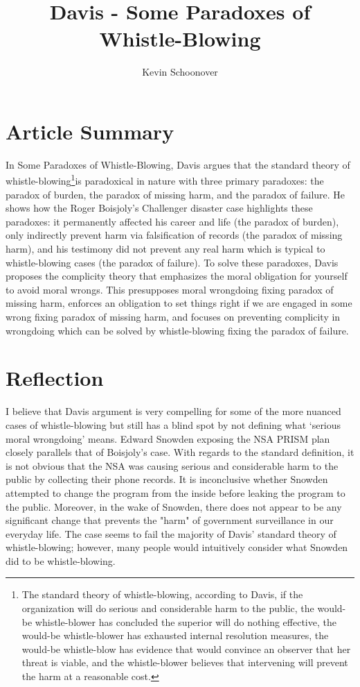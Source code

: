 \documentclass[12pt]{article}
\begin{document}
\title{Davis - Some Paradoxes of Whistle-Blowing}
\author{Kevin Schoonover}

\maketitle

\section{Article Summary}
In Some Paradoxes of Whistle-Blowing, Davis argues that the standard theory of
whistle-blowing\footnote{The standard theory of whistle-blowing, according to
Davis, if the organization will do serious and considerable harm to the public,
the would-be whistle-blower has concluded the superior will do nothing
effective, the would-be whistle-blower has exhausted internal resolution
measures, the would-be whistle-blow has evidence that would convince an observer
that her threat is viable, and the whistle-blower believes that intervening will
prevent the harm at a reasonable cost.}is paradoxical in nature with three
primary paradoxes: the paradox of burden, the paradox of missing harm, and the
paradox of failure.  He shows how the Roger Boisjoly's Challenger disaster case
highlights these paradoxes: it permanently affected his career and life (the
paradox of burden), only indirectly prevent harm via falsification of records
(the paradox of missing harm), and his testimony did not prevent any real harm
which is typical to whistle-blowing cases (the paradox of failure). To solve
these paradoxes, Davis proposes the complicity theory that emphasizes the moral
obligation for yourself to avoid moral wrongs. This presupposes moral wrongdoing
fixing paradox of missing harm, enforces an obligation to set things right if we
are engaged in some wrong fixing paradox of missing harm, and focuses on
preventing complicity in wrongdoing which can be solved by whistle-blowing
fixing the paradox of failure.

\section{Reflection}
I believe that Davis argument is very compelling for some of the more nuanced
cases of whistle-blowing but still has a blind spot by not defining what
`serious moral wrongdoing' means. Edward Snowden exposing the NSA PRISM plan
closely parallels that of Boisjoly's case. With regards to the standard
definition, it is not obvious that the NSA was causing serious and considerable
harm to the public by collecting their phone records.  It is inconclusive
whether Snowden attempted to change the program from the inside before leaking
the program to the public.  Moreover, in the wake of Snowden, there does not
appear to be any significant change that prevents the "harm" of government
surveillance in our everyday life.  The case seems to fail the majority of
Davis' standard theory of whistle-blowing; however, many people would
intuitively consider what Snowden did to be whistle-blowing.
\end{document}
